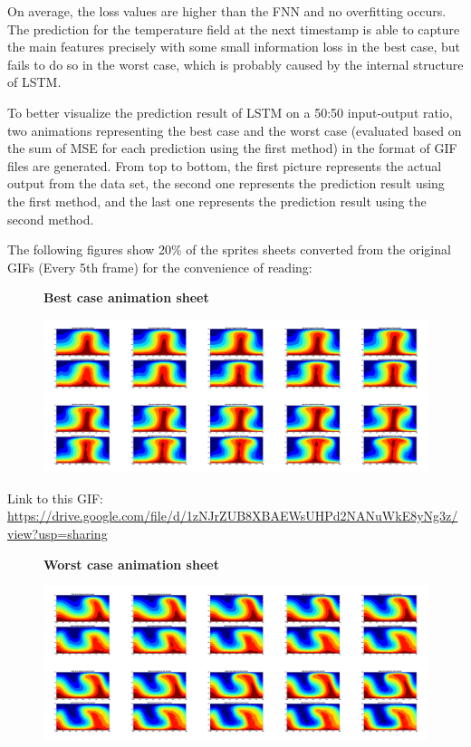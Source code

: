 On average, the loss values are higher than the FNN and no overfitting occurs. The prediction for the temperature field at the next timestamp is able to capture the main features precisely with some small information loss in the best case, but fails to do so in the worst case, which is probably caused by the internal structure of LSTM.

To better visualize the prediction result of LSTM on a 50:50 input-output ratio, two animations representing the best case and the worst case (evaluated based on the sum of MSE for each prediction using the first method) in the format of GIF files are generated. From top to bottom, the first picture represents the actual output from the data set, the second one represents the prediction result using the first method, and the last one represents the prediction result using the second method.

The following figures show 20\% of the sprites sheets converted from the original GIFs (Every 5th frame) for the convenience of reading:

\begin{figure}[H]
    \centering
    \textbf{Best case animation sheet}\par\medskip
    \includegraphics[scale=0.10]{Report LaTeX/figures/mantle_convection_images/Best_case_GIF_sheet_LSTM.png}
\end{figure}

Link to this GIF: \url{https://drive.google.com/file/d/1zNJrZUB8XBAEWsUHPd2NANuWkE8yNg3z/view?usp=sharing}

\begin{figure}[H]
    \centering
    \textbf{Worst case animation sheet}\par\medskip
    \includegraphics[scale=0.10]{Report LaTeX/figures/mantle_convection_images/Worst_case_GIF_sheet_LSTM.png}
\end{figure}

